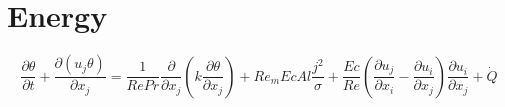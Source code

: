 \documentclass[11pt]{article}
\begin{document}







\section{Energy}
\Large
\begin{equation}
	\frac{\partial \theta}{\partial t} +
	\frac{\partial (u_j \theta)}{\partial x_j}
	= 
	\frac{1}{Re Pr}
	\frac{\partial}{\partial x_j}
	\left( 
	k \frac{\partial \theta}{\partial x_j}
	\right) + 
	Re_m Ec Al
	\frac{{j}^2}{\sigma} +
	\frac{Ec}{Re}
	\left(
	\frac{\partial u_j}{\partial x_i}
	-
	\frac{\partial u_i}{\partial x_j}
	\right)
	\frac{\partial u_i}{\partial x_j} +
	\dot{Q}
\end{equation}
\end{document}
